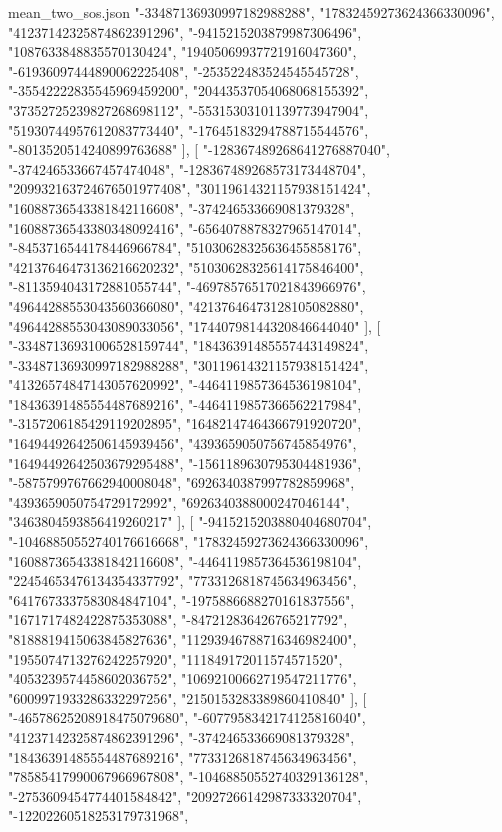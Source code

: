\begin{filecontents*}[overwrite]{mean_two_sos.json}
    "-33487136930997182988288",
    "17832459273624366330096",
    "41237142325874862391296",
    "-9415215203879987306496",
    "1087633848835570130424",
    "19405069937721916047360",
    "-61936097444890062225408",
    "-253522483524545545728",
    "-35542222835545969459200",
    "20443537054068068155392",
    "37352725239827268698112",
    "-55315303101139773947904",
    "51930744957612083773440",
    "-17645183294788715544576",
    "-8013520514240899763688"
   ],
   [
    "-128367489268641276887040",
    "-374246533667457474048",
    "-128367489268573173448704",
    "209932163724676501977408",
    "30119614321157938151424",
    "16088736543381842116608",
    "-374246533669081379328",
    "16088736543380348092416",
    "-6564078878327965147014",
    "-8453716544178446966784",
    "51030628325636455858176",
    "42137646473136216620232",
    "51030628325614175846400",
    "-8113594043172881055744",
    "-46978576517021843966976",
    "49644288553043560366080",
    "42137646473128105082880",
    "49644288553043089033056",
    "17440798144320846644040"
   ],
   [
    "-33487136931006528159744",
    "18436391485557443149824",
    "-33487136930997182988288",
    "30119614321157938151424",
    "41326574847143057620992",
    "-4464119857364536198104",
    "18436391485554487689216",
    "-4464119857366562217984",
    "-3157206185429119202895",
    "16482147464366791920720",
    "16494492642506145939456",
    "4393659050756745854976",
    "16494492642503679295488",
    "-1561189630795304481936",
    "-5875799767662940008048",
    "6926340387997782859968",
    "4393659050754729172992",
    "6926340388000247046144",
    "3463804593856419260217"
   ],
   [
    "-9415215203880404680704",
    "-10468850552740176616668",
    "17832459273624366330096",
    "16088736543381842116608",
    "-4464119857364536198104",
    "22454653476134354337792",
    "7733126818745634963456",
    "6417673337583084847104",
    "-1975886688270161837556",
    "1671717482422875353088",
    "-847212836426765217792",
    "8188819415063845827636",
    "11293946788716346982400",
    "1955074713276242257920",
    "111849172011574571520",
    "4053239574458602036752",
    "10692100662719547211776",
    "6009971933286332297256",
    "2150153283389860410840"
   ],
   [
    "-46578625208918475079680",
    "-6077958342174125816040",
    "41237142325874862391296",
    "-374246533669081379328",
    "18436391485554487689216",
    "7733126818745634963456",
    "78585417990067966967808",
    "-10468850552740329136128",
    "-2753609454774401584842",
    "20927266142987333320704",
    "-12202260518253179731968",

\end{filecontents*}
